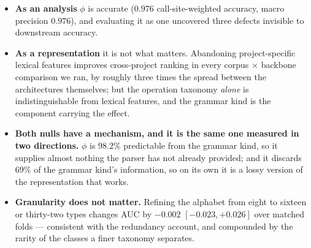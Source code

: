 \begin{itemize}
    \item \textbf{As an analysis} $\phi$ is accurate ($0.976$ call-site-weighted
          accuracy, macro precision $0.976$), and evaluating it as one uncovered
          three defects invisible to downstream accuracy.
    \item \textbf{As a representation} it is not what matters. Abandoning
          project-specific lexical features improves cross-project ranking in
          every corpus $\times$ backbone comparison we ran, by roughly three
          times the spread between the architectures themselves; but the
          operation taxonomy \emph{alone} is indistinguishable from lexical
          features, and the grammar kind is the component carrying the effect.
    \item \textbf{Both nulls have a mechanism, and it is the same one measured
          in two directions.} $\phi$ is $98.2\%$ predictable from the grammar
          kind, so it supplies almost nothing the parser has not already
          provided; and it discards $69\%$ of the grammar kind's information,
          so on its own it is a lossy version of the representation that works.
    \item \textbf{Granularity does not matter.} Refining the alphabet from
          eight to sixteen or thirty-two types changes AUC by $-0.002$ $[-0.023, +0.026]$
          over matched folds --- consistent with the redundancy account, and
          compounded by the rarity of the classes a finer taxonomy separates.
\end{itemize}
